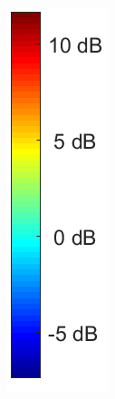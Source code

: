 \begin{minipage}{0.1\textwidth}
\begin{figure}[H]
\includegraphics[width=\textwidth]{figures/Not_Norm_space_colorbar.png}
\end{figure}
\end{minipage}


